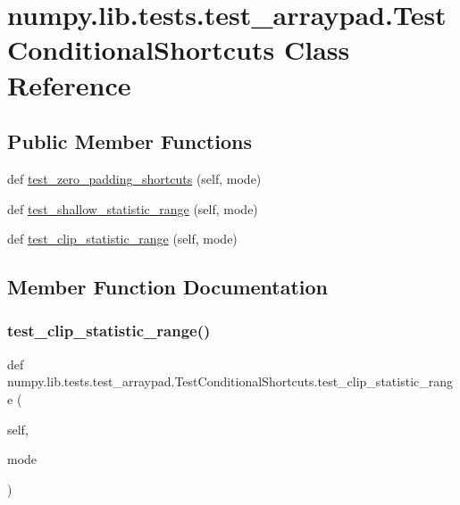 \hypertarget{classnumpy_1_1lib_1_1tests_1_1test__arraypad_1_1TestConditionalShortcuts}{}\section{numpy.\+lib.\+tests.\+test\+\_\+arraypad.\+Test\+Conditional\+Shortcuts Class Reference}
\label{classnumpy_1_1lib_1_1tests_1_1test__arraypad_1_1TestConditionalShortcuts}
\subsection*{Public Member Functions}
\begin{DoxyCompactItemize}
\item 
def \hyperlink{classnumpy_1_1lib_1_1tests_1_1test__arraypad_1_1TestConditionalShortcuts_a4f50458e8bb0d4af9f5c579a099dd812}{test\+\_\+zero\+\_\+padding\+\_\+shortcuts} (self, mode)
\item 
def \hyperlink{classnumpy_1_1lib_1_1tests_1_1test__arraypad_1_1TestConditionalShortcuts_a49590f6c5e216b14981300dde9b4521e}{test\+\_\+shallow\+\_\+statistic\+\_\+range} (self, mode)
\item 
def \hyperlink{classnumpy_1_1lib_1_1tests_1_1test__arraypad_1_1TestConditionalShortcuts_aafe4068f56f05769663832863aa6f501}{test\+\_\+clip\+\_\+statistic\+\_\+range} (self, mode)
\end{DoxyCompactItemize}


\subsection{Member Function Documentation}
\mbox{\label{classnumpy_1_1lib_1_1tests_1_1test__arraypad_1_1TestConditionalShortcuts_aafe4068f56f05769663832863aa6f501}} 
\subsubsection{\texorpdfstring{test\+\_\+clip\+\_\+statistic\+\_\+range()}{test\_clip\_statistic\_range()}}
{\footnotesize\ttfamily def numpy.\+lib.\+tests.\+test\+\_\+arraypad.\+Test\+Conditional\+Shortcuts.\+test\+\_\+clip\+\_\+statistic\+\_\+range (\begin{DoxyParamCaption}\item[{}]{self,  }\item[{}]{mode }\end{DoxyParamCaption})}


